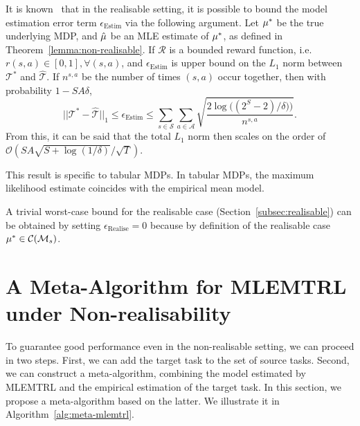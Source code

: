 \begin{remark}\label{remark:l1_norm}
It is known~\citep{strehl2005theoretical, auer2008near, qian2020concentration} that in the realisable setting, it is possible to bound the model estimation error term $\epsilon_{\mathrm{Estim}}$ via the following argument. Let $\mu^*$ be the true underlying MDP, and $\hat{\mu}$ be an MLE estimate of $\mu^*$, as defined in Theorem~\ref{lemma:non-realisable}. If $\mathcal{R}$ is a bounded reward function, i.e. $r(s, a) \in [0, 1], \forall{(s, a)}$, and $\epsilon_{\mathrm{Estim}}$ is upper bound on the $L_1$ norm between $\mathcal{T}^*$ and $\hat{\mathcal{T}}$. If $n^{s,a}$ be the number of times $(s,a)$ occur together, then with probability $1-SA\delta$,
\begin{equation*}
        ||\mathcal{T}^*-\hat{\mathcal{T}}||_1 \leq \epsilon_{\mathrm{Estim}} \leq \sum_{s\in\mathcal{S}}\sum_{a\in\mathcal{A}}\sqrt{\frac{2\log\big((2^S -2)/\delta)\big)}{n^{s,a}}}. %
\end{equation*}
    From this, it can be said that the total $L_1$ norm then scales on the order of $\mathcal{O}(SA\sqrt{S+\log(1/\delta)}/\sqrt{T})$.
\end{remark}
This result is specific to tabular MDPs. In tabular MDPs, the maximum likelihood estimate coincides with the empirical mean model. 

\begin{remark}
A trivial worst-case bound for the realisable case (Section~\ref{subsec:realisable}) can be obtained by setting $\epsilon_{\mathrm{Realise}}=0$ because by definition of the realisable case $\mu^{*} \in \mathcal{C}(\mathcal{M}_s)$.
\end{remark}


\section{A Meta-Algorithm for MLEMTRL under Non-realisability}\label{sec:meta_mlemtrl}

To guarantee good performance even in the non-realisable setting, we can proceed in two steps. First, we can add the target task to the set of source tasks. Second, we can construct a meta-algorithm, combining the model estimated by MLEMTRL and the empirical estimation of the target task. In this section, we propose a meta-algorithm based on the latter. We illustrate it in Algorithm~\ref{alg:meta-mlemtrl}. 


